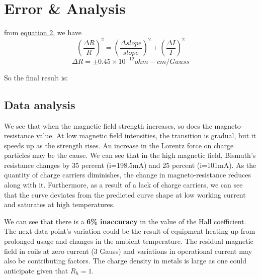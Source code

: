 \section{Error \& Analysis}
    from \hyperref[eqn:2]{equation 2}, we have
    $$\left(\frac{\Delta R}{R}\right)^2=\left(\frac{\Delta slope}{slope}\right)^2 + \left(\frac{\Delta I }{I}\right)^2$$
    $$\Delta R=\pm 0.45 \times 10^{-12} ohm-cm/Gauss$$

	So the final result is:

	\subsection{Data analysis}
    	We see that when the magnetic field strength increases, so does the magneto-resistance value. At low magnetic field intensities, the transition is gradual, but it speeds up as the strength rises. An increase in the Lorentz force on charge particles may be the cause. We can see that in the high magnetic field, Bismuth's resistance changes by 35 percent (i=198.5mA) and 25 percent (i=101mA). As the quantity of charge carriers diminishes, the change in magneto-resistance reduces along with it. Furthermore, as a result of a lack of charge carriers, we can see that the curve deviates from the predicted curve shape at low working current and saturates at high temperatures.

    	We can see that there is a \textbf{6\% inaccuracy} in the value of the Hall coefficient. The next data point's variation could be the result of equipment heating up from prolonged usage and changes in the ambient temperature. The residual magnetic field in coils at zero current (3 Gauss) and variations in operational current may also be contributing factors. The charge density in metals is large as one could anticipate given that $R_h = 1$.